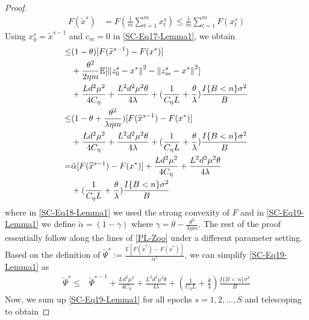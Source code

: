 \documentclass{article}
\newcommand*{\E}{\mathbb{E}}
\newcommand{\norm}[1]{\left\lVert#1\right\rVert}
\theoremstyle{definition}
\theoremstyle{remark}
\begin{document}
{\begin{proof}
\begin{equation}
\begin{split}
F(\widetilde{x}^s) &= F(\frac{1}{m}\sum_{t=1}^{m} x_{t}^s)\leq \frac{1}{m}\sum_{t=1}^{m}F(x_{t}^s)
\end{split}
\end{equation}
Using $x_0^s = \widetilde{x}^{s-1}$ and $c_m=0$ in \eqref{SC-Eq17-Lemma1}, we obtain
\begin{align}
[F(\widetilde{x}^{s})-F(x^*)] \leq &(1-\theta)[F(\widetilde{x}^{s-1})-F(x^*)]\notag \\
&+ {\frac{ \theta^2}{2\eta m}}\E[\norm{z_{0}^s-x^*}^2-\norm{z_{m}^s-x^*}^2]\notag\\
&+\frac{Ld^2\mu^2}{4C_{\eta}}+\frac{ L^2d^2\mu^2\theta}{4\lambda}+(\frac{1}{C_{\eta} L}+\frac{\theta}{\lambda})\frac{I\{B < n\} \sigma ^2}{B}\notag\\
\leq&(1-\theta+\frac{ \theta^2}{\lambda\eta m})[F(\widetilde{x}^{s-1})-F(x^*)] \notag\\
&+\frac{Ld^2\mu^2}{4C_{\eta}}+\frac{ L^2d^2\mu^2\theta}{4\lambda}+(\frac{1}{C_{\eta} L}+\frac{\theta}{\lambda})\frac{I\{B < n\} \sigma ^2}{B}\label{SC-Eq18-Lemma1}\\
=&\tilde{\alpha}[F(\widetilde{x}^{s-1})-F(x^*)] +\frac{Ld^2\mu^2}{4C_{\eta}}+\frac{ L^2d^2\mu^2\theta}{4\lambda}\notag\\
&+(\frac{1}{C_{\eta} L}+\frac{\theta}{\lambda})\frac{I\{B < n\} \sigma ^2}{B}\label{SC-Eq19-Lemma1}
\end{align}
where in \eqref{SC-Eq18-Lemma1} we used the strong convexity of $F$ and in \eqref{SC-Eq19-Lemma1} we define $\tilde{\alpha} = (1-\gamma)$ where $\gamma  = \theta - \frac{ \theta^2}{\lambda\eta m}$. The rest of the proof essentially follow along the lines of \ref{PL-Zoo} under a different parameter setting. Based on the definition of $\widetilde{\Psi}^s := \frac{\E[F(\tilde{x}^s)-F(x^*)]}{{\alpha}^s}$, we can simplify \eqref{SC-Eq19-Lemma1} as
 {\color{blue}
\begin{equation}\label{SC-Eq19-1-Lemma1}
\begin{split}
\widetilde{\Psi}^s \leq& \widetilde{\Psi}^{s-1} + \frac{Ld^2\mu^2}{4C_{\eta}}+\frac{ L^2d^2\mu^2\theta}{4\lambda}+(\frac{1}{C_{\eta} L}+\frac{\theta}{\lambda})\frac{I\{B < n\} \sigma ^2}{B}
\end{split}
\end{equation}
}
Now, we sum up \eqref{SC-Eq19-Lemma1} for all epochs $s=1, 2,\ldots, S$ and telescoping to obtain


\end{proof}}
\end{document}
